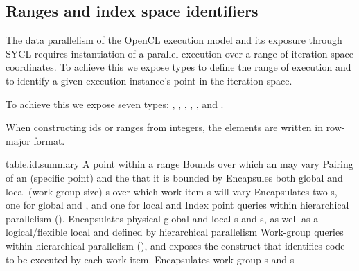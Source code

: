 

\subsection{Ranges and index space identifiers}
\label{ranges-identifiers}

The data parallelism of the OpenCL execution model and its exposure
through SYCL requires instantiation of a parallel execution over a
range of iteration space coordinates. To achieve this we expose types
to define the range of execution and to identify a given execution
instance's point in the iteration space.

To achieve this we expose seven types: ,
, , , ,
 and .

When constructing ids or ranges from integers, the elements are
written in row-major format.

{table.id.summary}
   {A point within a range}
   {Bounds over which an  may vary}
   {Pairing of an  (specific point) and the  that it is bounded by}
   {Encapsules both global and local (work-group size) \mbox{s} over which work-item \mbox{s} will vary}
   {Encapsulates two \mbox{s}, one for global  and , and one for local  and }
   {Index point queries within hierarchical parallelism ().  Encapsulates physical global and local \mbox{s} and \mbox{s}, as well as a logical/flexible local  and  defined by hierarchical parallelism}
   {Work-group queries within hierarchical parallelism (), and exposes the  construct that identifies code to be executed by each work-item.  Encapsulates work-group \mbox{s} and \mbox{s}}
\completeTable

